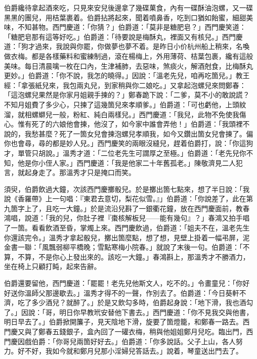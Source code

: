伯爵纔待拿起酒來吃，只見來安兒後邊拿了幾碟菓食，內有一碟酥油泡螺，又一碟黑黑的團兒，用桔葉裹着。伯爵拈將起來，聞着噴鼻香，吃到口猶如飴蜜，細甜美味，不知甚物。西門慶道：「你猜？」伯爵道：「莫非是糖肥皂？」西門慶笑道：「糖肥皂那有這等好吃。」伯爵道：「待要說是梅酥丸，裡面又有核兒。」西門慶道：「狗才過來，我說與你罷，你做夢也夢不着。是昨日小价杭州船上稍來，名喚做衣梅。都是各樣藥料和蜜練制過，滾在楊梅上，外用薄荷、桔葉包裹，纔有這般美味。每日清晨噙一枚在口內，生津補肺，去惡味，煞痰火，解酒尅食，比梅酥丸更妙。」伯爵道：「你不說，我怎的曉得。」因說：「溫老先兒，咱再吃箇兒。」教王經：「拿張紙兒來，我包兩丸兒，到家稍與你二娘吃。」又拿起泡螺兒來問鄭春：「這泡螺兒果然是你家月姐親手揀的？」鄭春跪下說：「二爹，莫不小的敢說謊？不知月姐費了多少心，只揀了這幾箇兒來孝順爹。」伯爵道：「可也虧他，上頭紋溜，就相螺螄兒一般，粉紅、純白兩樣兒。」西門慶道：「我兒，此物不免使我傷心。惟有死了的六娘他會揀，他沒了，如今家中誰會弄他！」伯爵道：「我頭裡不說的，我愁甚麼？死了一箇女兒會揀泡螺兒孝順我，如今又鑽出箇女兒會揀了。偏你也會尋，尋的都是妙人兒。」{}西門慶笑的兩眼沒縫兒，趕着伯爵打，說：「你這狗才，單管只胡說。」溫秀才道：「二位老先生可謂厚之至極。」{}伯爵道：「老先兒你不知，他是你小侄人家。」西門慶道：「我是他家二十年舊孤老。」陳敬濟見二人犯言，就起身走了。那溫秀才只是掩口而笑。{}

須臾，伯爵飲過大鐘，次該西門慶擲骰兒。於是擲出箇七點來，想了半日說：「我說《香羅帶》上一句唱：『東君去意切，梨花似雪。』」伯爵道：「你說差了，此在第九箇字上了，且吃一大鐘。」於是流沿兒斟了一銀衢花鐘，放在西門慶面前，教春鴻唱，說道：「我的兒，你肚子裡『棗核解板兒——能有幾句』？」春鴻又拍手唱了一箇。看看飲酒至昏，掌燭上來。西門慶飲過，伯爵道：「姐夫不在，溫老先生你還該完令。」溫秀才拿起骰兒，擲出箇麼點，想了想，見壁上掛着一幅弔屏，泥金書一聯：「風飄弱柳平橋晚；雪點寒梅小院春。」就說了末後一句。伯爵道：「不算，不算，不是你心上發出來的。該吃一大鐘。」春鴻斟上，那溫秀才不勝酒力，坐在椅上只顧打盹，起來告辭。

伯爵還要留他，西門慶道：「罷罷！老先兒他斯文人，吃不的。」令畫童兒：「你好好送你溫師父那邊歇去。」溫秀才得不的一聲，作別去了。伯爵道：「今日葵軒不濟，吃了多少酒兒？就醉了。」於是又飲勾多時，伯爵起身說：「地下滑，我也酒勾了。」因說：「哥，明日你早教玳安替他下書去。」西門慶道：「你不見我交與他書，明日早去了。」伯爵掀開簾子，見天陰地下滑，旋要了箇燈籠，和鄭春一路去。西門慶又與了鄭春五錢銀子，盒內回了一礶衣梅，稍與他姐姐鄭月兒吃。臨出門，西門慶因戲伯爵：「你哥兒兩箇好好去。」{}伯爵道：「你多說話。父子上山，各人努力。好不好，我如今就和鄭月兒那小淫婦兒答話去。」說着，琴童送出門去了。

